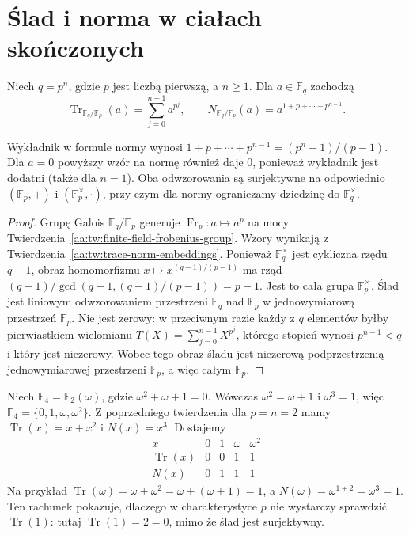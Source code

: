 \section{Ślad i norma w ciałach skończonych}
\begin{twierdzenie}
\label{aa:tw:finite-field-trace-norm}
Niech $q=p^n$, gdzie $p$ jest liczbą pierwszą,
a $n\ge1$. Dla $a\in\mathbb F_q$ zachodzą
\[
\operatorname{Tr}_{\mathbb F_q/\mathbb F_p}(a)
=\sum_{j=0}^{n-1}a^{p^j},\qquad
N_{\mathbb F_q/\mathbb F_p}(a)=a^{1+p+\cdots+p^{n-1}}.
\]

Wykładnik w formule normy wynosi
$1+p+\cdots+p^{n-1}=(p^n-1)/(p-1)$.
Dla $a=0$ powyższy wzór na normę również daje $0$,
ponieważ wykładnik jest dodatni (także dla $n=1$).
Oba odwzorowania są surjektywne na odpowiednio
$(\mathbb F_p,+)$ i $(\mathbb F_p^\times,\cdot)$,
przy czym dla normy ograniczamy dziedzinę do $\mathbb F_q^\times$.
\end{twierdzenie}
\begin{proof}
Grupę Galois $\mathbb F_q/\mathbb F_p$ generuje
$\operatorname{Fr}_p:a\mapsto a^p$ na mocy
Twierdzenia~\ref{aa:tw:finite-field-frobenius-group}.
Wzory wynikają z
Twierdzenia~\ref{aa:tw:trace-norm-embeddings}.
Ponieważ $\mathbb F_q^\times$ jest cykliczna rzędu $q-1$,
obraz homomorfizmu $x\mapsto x^{(q-1)/(p-1)}$
ma rząd
$(q-1)/\gcd(q-1,(q-1)/(p-1))=p-1$.
Jest to cała grupa $\mathbb F_p^\times$.
Ślad jest liniowym odwzorowaniem przestrzeni
$\mathbb F_q$ nad $\mathbb F_p$ w jednowymiarową
przestrzeń $\mathbb F_p$. Nie jest zerowy: w przeciwnym
razie każdy z $q$ elementów byłby pierwiastkiem
wielomianu $T(X)=\sum_{j=0}^{n-1}X^{p^j}$,
którego stopień wynosi $p^{n-1}<q$ i który jest
niezerowy. Wobec tego obraz śladu jest niezerową
podprzestrzenią jednowymiarowej przestrzeni $\mathbb F_p$,
a więc całym $\mathbb F_p$.
\end{proof}

\begin{przyklad}
\label{aa:prz:finite-field-trace-four}
Niech $\mathbb F_4=\mathbb F_2(\omega)$, gdzie
$\omega^2+\omega+1=0$. Wówczas $\omega^2=\omega+1$
i $\omega^3=1$, więc $\mathbb F_4=\{0,1,\omega,\omega^2\}$.
Z poprzedniego twierdzenia dla $p=n=2$ mamy
$\operatorname{Tr}(x)=x+x^2$ i $N(x)=x^3$.
Dostajemy
\[
\begin{array}{c|cccc}
x&0&1&\omega&\omega^2\\\hline
\operatorname{Tr}(x)&0&0&1&1\\
N(x)&0&1&1&1
\end{array}
\]
Na przykład $\operatorname{Tr}(\omega)=\omega+\omega^2
=\omega+(\omega+1)=1$, a
$N(\omega)=\omega^{1+2}=\omega^3=1$.
Ten rachunek pokazuje, dlaczego w charakterystyce $p$
nie wystarczy sprawdzić $\operatorname{Tr}(1)$:
tutaj $\operatorname{Tr}(1)=2=0$, mimo że ślad jest surjektywny.
\end{przyklad}

